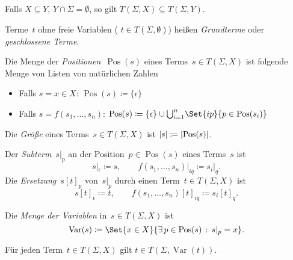 \documentclass{cheat-sheet}
\DeclareMathOperator{\Pos}{Pos} %
\newcommand{\size}[1]{\abs{{#1}}} %
\DeclareMathOperator{\Var}{Var} %
\begin{document}
\begin{bem}
  Falls $X \subseteq Y$, $Y \cap \Sigma = \emptyset$, so gilt $T(\Sigma, X) \subseteq T(\Sigma, Y)$.
\end{bem}

\begin{defn}
  Terme~$t$ ohne freie Variablen (\dh{} $t \in T(\Sigma, \emptyset)$) heißen \emph{Grundterme} oder \emph{geschlossene Terme}.
\end{defn}

\begin{defn}
  Die Menge der \emph{Positionen}~$\Pos(s)$ eines Terms~$s \in T(\Sigma, X)$ ist folgende Menge von Listen von natürlichen Zahlen
  \begin{itemize}
    \item Falls $s = x \in X$: $\Pos(s) \coloneqq \{ \epsilon \}$
    \item Falls $s = f(s_1, \ldots, s_n)$: $\Pos(s) \coloneqq \{ \epsilon \} \cup {\bigcup}_{i=1}^n \Set{i p}{p \in \Pos(s_i)}$
  \end{itemize}
\end{defn}

\begin{defn}
  Die \emph{Größe} eines Terms~$s \in T(\Sigma, X)$ ist $\size{s} \coloneqq \abs{\Pos(s)}$.
\end{defn}

\begin{defn}
  Der \emph{Subterm}~$s|_p$ an der Position~$p \in \Pos(s)$ eines Terms~$s$ ist
  \[
    s|_\epsilon \coloneqq s, \qquad
    f(s_1, \ldots, s_n)|_{i q} \coloneqq s_i|_q.
  \]
  Die \emph{Ersetzung}~$s[t]_p$ von~$s|_p$ durch einen Term~$t \in T(\Sigma, X)$ ist
  \[
    s[t]_\epsilon \coloneqq t, \qquad
    f(s_1, \ldots, s_n)[t]_{i q} \coloneqq s_i[t]_q.
  \]
\end{defn}

\begin{defn}
  Die \emph{Menge der Variablen} in~$s \in T(\Sigma, X)$ ist
  \[
    \Var(s) \coloneqq \Set{x \in X}{\ex{p \in \Pos(s)} s|_p = x}.
  \]
\end{defn}

\begin{bem}
  Für jeden Term~$t \in T(\Sigma, X)$ gilt $t \in T(\Sigma, \Var(t))$.
\end{bem}

\end{document}
